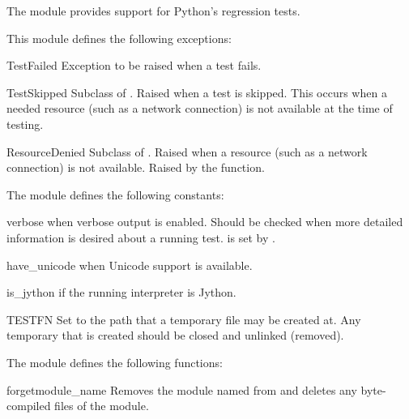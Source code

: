 
The  module provides support for Python's
regression tests.

This module defines the following exceptions:

\begin{excdesc}{TestFailed}
Exception to be raised when a test fails.
\end{excdesc}

\begin{excdesc}{TestSkipped}
Subclass of .
Raised when a test is skipped.
This occurs when a needed resource (such as a network connection) is not
available at the time of testing.
\end{excdesc}

\begin{excdesc}{ResourceDenied}
Subclass of .
Raised when a resource (such as a network connection) is not available.
Raised by the  function.
\end{excdesc}


The  module defines the following constants:

\begin{datadesc}{verbose}
 when verbose output is enabled.
Should be checked when more detailed information is desired about a running
test.
 is set by .
\end{datadesc}

\begin{datadesc}{have_unicode}
 when Unicode support is available.
\end{datadesc}

\begin{datadesc}{is_jython}
 if the running interpreter is Jython.
\end{datadesc}

\begin{datadesc}{TESTFN}
Set to the path that a temporary file may be created at.
Any temporary that is created should be closed and unlinked (removed).
\end{datadesc}


The  module defines the following functions:

\begin{funcdesc}{forget}{module_name}
Removes the module named  from  and deletes
any byte-compiled files of the module.
\end{funcdesc}

